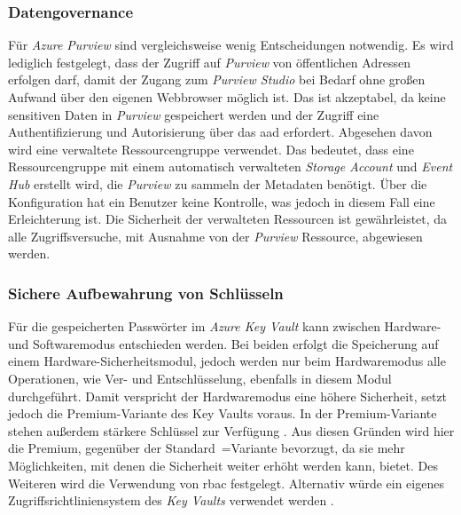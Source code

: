 \subsubsection{Datengovernance} \label{subsec:infra:konfig:purview}
Für \textit{Azure Purview} sind vergleichsweise wenig Entscheidungen notwendig. Es wird lediglich festgelegt, dass der Zugriff auf \textit{Purview} von öffentlichen Adressen erfolgen darf, damit der Zugang zum \textit{Purview Studio} bei Bedarf ohne großen Aufwand über den eigenen Webbrowser möglich ist. Das ist akzeptabel, da keine sensitiven Daten in \textit{Purview} gespeichert werden und der Zugriff eine Authentifizierung und Autorisierung über das \ac{aad} erfordert. Abgesehen davon wird eine verwaltete Ressourcengruppe verwendet. Das bedeutet, dass eine Ressourcengruppe mit einem automatisch verwalteten \textit{Storage Account} und \textit{Event Hub} erstellt wird, die \textit{Purview} zu sammeln der Metadaten benötigt. Über die Konfiguration hat ein Benutzer keine Kontrolle, was jedoch in diesem Fall eine Erleichterung ist. Die Sicherheit der verwalteten Ressourcen ist gewährleistet, da alle Zugriffsversuche, mit Ausnahme von der \textit{Purview} Ressource, abgewiesen werden. \cite[vgl.][]{msdoc_22_purviewDeploymentBestPract, msdoc_21_managedApps}

\subsubsection{Sichere Aufbewahrung von Schlüsseln} \label{subsec:infra:konfig:keyVault}
Für die gespeicherten Passwörter im \textit{Azure Key Vault} kann zwischen Hardware- und Softwaremodus entschieden werden. Bei beiden erfolgt die Speicherung auf einem Hardware-Sicherheitsmodul, jedoch werden nur beim Hardwaremodus alle Operationen, wie Ver- und Entschlüsselung, ebenfalls in diesem Modul durchgeführt. Damit verspricht der Hardwaremodus eine höhere Sicherheit, setzt jedoch die Premium-Variante des Key Vaults voraus. In der Premium-Variante stehen außerdem stärkere Schlüssel zur Verfügung \cite{haunts_key_2019}. Aus diesen Gründen wird hier die Premium, gegenüber der Standard~=Variante bevorzugt, da sie mehr Möglichkeiten, mit denen die Sicherheit weiter erhöht werden kann, bietet. Des Weiteren wird die Verwendung von \ac{rbac} festgelegt. Alternativ würde ein eigenes Zugriffsrichtliniensystem des \textit{Key Vaults} verwendet werden \cite[vgl.][]{herath_azure_2022}.

